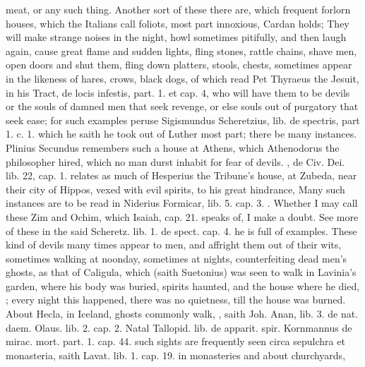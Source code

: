 {{meat, or any such thing. Another sort of these there are, which
frequent forlorn houses, which the Italians call foliots, most
part innoxious, Cardan holds; They will make strange noises in
the night, howl sometimes pitifully, and then laugh again, cause great
flame and sudden lights, fling stones, rattle chains, shave men, open
doors and shut them, fling down platters, stools, chests, sometimes
appear in the likeness of hares, crows, black dogs, \etc{} of which read
Pet Thyraeus the Jesuit, in his \textlatin{Tract, de locis infestis, part.
1. et cap. 4}, who will have them to be devils or the souls of damned
men that seek revenge, or else souls out of purgatory that seek ease;
for such examples peruse Sigismundus Scheretzius, \textlatin{lib. de
spectris, part 1. c. 1.} which he saith he took out of Luther most part;
there be many instances. Plinius Secundus remembers such a house
at Athens, which Athenodorus the philosopher hired, which no man durst
inhabit for fear of devils. \Austin{}, \textlatin{de Civ. Dei. lib. 22, cap. 1.}
relates as much of Hesperius the Tribune's house, at Zubeda, near their
city of Hippos, vexed with evil spirits, to his great hindrance,  Many such instances are to be
read in Niderius Formicar, lib. 5. cap.  3. \etc{}. Whether I may call
these Zim and Ochim, which Isaiah, cap.  21. speaks of, I make a
doubt. See more of these in the said Scheretz. lib. 1. de spect. cap.
4. he is full of examples. These kind of devils many times appear to
men, and affright them out of their wits, sometimes walking at
noonday, sometimes at nights, counterfeiting dead men's ghosts,
as that of Caligula, which (saith Suetonius) was seen to walk in
Lavinia's garden, where his body was buried, spirits haunted, and the
house where he died, ; every night this happened, there was no quietness,
till the house was burned. About Hecla, in Iceland, ghosts commonly
walk, , saith Joh. Anan, lib. 3. de nat.
daem. Olaus. lib. 2. cap. 2. Natal Tallopid. lib. de apparit. spir.
Kornmannus de mirac. mort. part. 1. cap. 44. such sights are frequently
seen circa sepulchra et monasteria, saith Lavat. lib. 1. cap. 19. in
monasteries and about churchyards, }}
